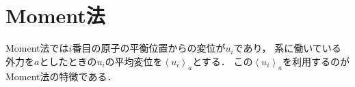 \documentclass[10pt,twocolumn,a4j]{jsarticle}
\begin{document}
\section{Moment法}
Moment法では$i$番目の原子の平衡位置からの変位が$u_i$であり，
系に働いている外力を$a$としたときの$u_i$の平均変位を$\left<u_i\right>_a$とする．
この$\left<u_i\right>_a$を利用するのがMoment法の特徴である．

\end{document}
